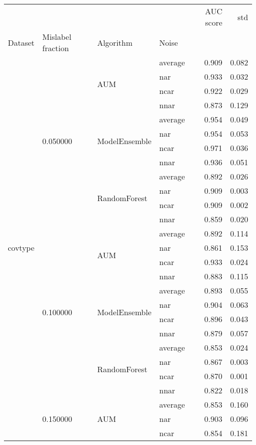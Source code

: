 \begin{longtable}{llllrr}
\toprule
 &  &  &  & AUC score & std \\
Dataset & Mislabel fraction & Algorithm & Noise &  &  \\
\midrule
\multirow[t]{120}{*}{covtype} & \multirow[t]{12}{*}{0.050000} & \multirow[t]{4}{*}{AUM} & average & 0.909 & 0.082 \\
 &  &  & nar & 0.933 & 0.032 \\
 &  &  & ncar & 0.922 & 0.029 \\
 &  &  & nnar & 0.873 & 0.129 \\
\cline{3-6}
 &  & \multirow[t]{4}{*}{ModelEnsemble} & average & 0.954 & 0.049 \\
 &  &  & nar & 0.954 & 0.053 \\
 &  &  & ncar & 0.971 & 0.036 \\
 &  &  & nnar & 0.936 & 0.051 \\
\cline{3-6}
 &  & \multirow[t]{4}{*}{RandomForest} & average & 0.892 & 0.026 \\
 &  &  & nar & 0.909 & 0.003 \\
 &  &  & ncar & 0.909 & 0.002 \\
 &  &  & nnar & 0.859 & 0.020 \\
\cline{2-6} \cline{3-6}
 & \multirow[t]{12}{*}{0.100000} & \multirow[t]{4}{*}{AUM} & average & 0.892 & 0.114 \\
 &  &  & nar & 0.861 & 0.153 \\
 &  &  & ncar & 0.933 & 0.024 \\
 &  &  & nnar & 0.883 & 0.115 \\
\cline{3-6}
 &  & \multirow[t]{4}{*}{ModelEnsemble} & average & 0.893 & 0.055 \\
 &  &  & nar & 0.904 & 0.063 \\
 &  &  & ncar & 0.896 & 0.043 \\
 &  &  & nnar & 0.879 & 0.057 \\
\cline{3-6}
 &  & \multirow[t]{4}{*}{RandomForest} & average & 0.853 & 0.024 \\
 &  &  & nar & 0.867 & 0.003 \\
 &  &  & ncar & 0.870 & 0.001 \\
 &  &  & nnar & 0.822 & 0.018 \\
\cline{2-6} \cline{3-6}
 & \multirow[t]{12}{*}{0.150000} & \multirow[t]{4}{*}{AUM} & average & 0.853 & 0.160 \\
 &  &  & nar & 0.903 & 0.096 \\
 &  &  & ncar & 0.854 & 0.181 \\

\end{longtable}
